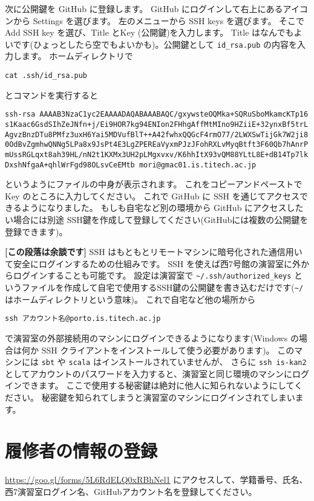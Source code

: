 \documentclass[a4paper,11pt, article]{memoir}
\begin{document}
次に公開鍵を GitHub に登録します。
GitHub にログインして右上にあるアイコンから Settings を選びます。
左のメニューから SSH keys を選びます。
そこで Add SSH key を選び、Title  とKey (公開鍵)を入力します。
Title はなんでもよいです(ひょっとしたら空でもよいかも)。公開鍵として \texttt{id\_rsa.pub} の内容を入力します。
ホームディレクトリで
\begin{verbatim}
cat .ssh/id_rsa.pub
\end{verbatim}
とコマンドを実行すると
\small
\begin{verbatim}
ssh-rsa AAAAB3NzaC1yc2EAAAADAQABAAABAQC/gxywsteOQMka+SQRuSboMkamcKTp16
s1Kaac6GsdSIhZeJNfn+j/Ei9HOR7kg94ENIon2FHhgAffMtMIno9HZiiE+32ynxBf5trL
AgvzBnzDTu8PMfz3uxH6Yai5MDVufBlT++A42fwhxQQGcF4rmO77/2LWXSwTijGk7W2ji8
0OdBvZgmhwQNNg5LPa8x9JsPt4E3LgZPEREaVyxmPJzJFohRXLvMyqBtft3F60Qb7hAnrP
mUssRGLqxt8ah39HL/nN2t1KXMx3UH2pLMgxvxv/K6hhItX93vQM88YLtL8E+dB14Tp7lk
DxshNfgaA+qhlWrFgd98OLsvCeEMtb mori@gmac01.is.titech.ac.jp
\end{verbatim}
\normalsize
というようにファイルの中身が表示されます。
これをコピーアンドペーストで Key のところに入力してください。
%
これで GitHub に SSH を通じてアクセスできるようになりました。
もしも自宅など別の環境から GitHub にアクセスしたい場合には別途 SSH鍵を作成して登録してください(GitHubには複数の公開鍵を登録できます)。

\textbf{[この段落は余談です]} SSH はもともとリモートマシンに暗号化された通信用いて安全にログインするための仕組みです。
SSH を使えば西7号館の演習室に外からログインすることも可能です。
設定は演習室で \texttt{\~{}/.ssh/authorized\_keys} というファイルを作成して自宅で使用するSSH鍵の公開鍵を書き込むだけです(\texttt{\~{}/}はホームディレクトリという意味)。
これで自宅など他の場所から
\begin{verbatim}
ssh アカウント名@porto.is.titech.ac.jp
\end{verbatim}
で演習室の外部接続用のマシンにログインできるようになります(Windows の場合は何か SSH クライアントをインストールして使う必要があります)。
このマシンには \texttt{sbt} や \texttt{scala} はインストールされていませんが、
さらに \texttt{ssh is-kan2} としてアカウントのパスワードを入力すると、演習室と同じ環境のマシンにログインできます。
ここで使用する秘密鍵は絶対に他人に知られないようにしてください。
秘密鍵を知られてしまうと演習室のマシンにログインされてしまいます。


\section{履修者の情報の登録}
\url{https://goo.gl/forms/5L6RdELQ0xRBhNel1} にアクセスして、学籍番号、氏名、西7演習室ログイン名、GitHubアカウント名を登録してください。
\end{document}
